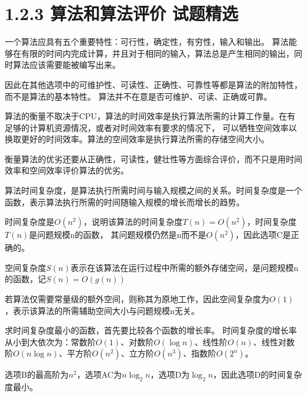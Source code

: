 \documentclass[b5paper,11pt]{article}
\begin{document}
\newpage{}

\section{1.2.3 算法和算法评价 \space{}试题精选}

一个算法应具有五个重要特性：可行性，确定性，有穷性，输入和输出。
算法能够在有限的时间内完成计算，并且对于相同的输入，算法总是产生相同的输出，同时算法应该需要能被编写出来。

因此在其他选项中的可维护性、可读性、正确性、可靠性等都是算法的附加特性，而不是算法的基本特性。
算法并不在意是否可维护、可读、正确或可靠。


算法的衡量不取决于CPU，算法的时间效率是执行算法所需的计算工作量。在有足够的计算机资源情况，或者对时间效率有要求的情况下，
可以牺牲空间效率以换取更好的时间效率。算法的空间效率是执行算法所需的存储空间大小。

衡量算法的优劣还要从正确性，可读性，健壮性等方面综合评价，而不只是用时间效率和空间效率评价算法的优劣。


算法时间复杂度，是算法执行所需时间与输入规模之间的关系。时间复杂度是一个函数，表示算法执行所需的时间随输入规模的增长而增长的趋势。

时间复杂度是$O(n^2)$，说明该算法的时间复杂度$T(n) = O(n^2)$，时间复杂度$T(n)$是问题规模n的函数，
其问题规模仍然是n而不是$O(n^2)$，因此选项C是正确的。


空间复杂度$S(n)$表示在该算法在运行过程中所需的额外存储空间，是问题规模n的函数，记$S(n) = O(g(n))$

若算法仅需要常量级的额外空间，则称其为原地工作，因此空间复杂度为$O(1)$，表示该算法的所需辅助空间大小与问题规模n无关。


求时间复杂度最小的函数，首先要比较各个函数的增长率。
时间复杂度的增长率从小到大依次为：常数阶$O(1)$、对数阶$O(\log n)$、线性阶$O(n)$、线性对数阶$O(n\log n)$、平方阶$O(n^2)$、立方阶$O(n^3)$、指数阶$O(2^n)$。

选项B的最高阶为$n^2$，选项AC为$n\log_2 n$，选项D为$\log_2 n$，因此选项D的时间复杂度最小。
\end{document}

